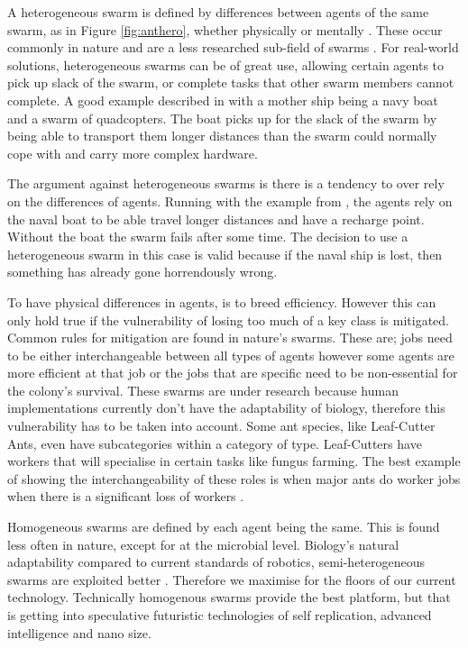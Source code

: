 \documentclass{UoYCSproject}
\begin{document}
A heterogeneous swarm is defined by differences between agents of the same swarm, as in Figure \ref{fig:anthero}, whether physically or mentally \cite{Swarm robotics reviewed, Swarm intellegiegence}.
These occur commonly in nature and are a less researched sub-field of swarms \cite{Swarm intellegiegence}.
For real-world solutions, heterogeneous swarms can be of great use, allowing certain agents to pick up slack of the swarm, or complete tasks that other swarm members cannot complete.
A good example described in \cite{Swarm robotics reviewed} with a mother ship being a navy boat and a swarm of quadcopters.
The boat picks up for the slack of the swarm by being able to transport them longer distances than the swarm could normally cope with and carry more complex hardware.

The argument against heterogeneous swarms is there is a tendency to over rely on the differences of agents.
Running with the example from \cite{Swarm robotics reviewed}, the agents rely on the naval boat to be able travel longer distances and have a recharge point.
Without the boat the swarm fails after some time.
The decision to use a heterogeneous swarm in this case is valid because if the naval ship is lost, then something has already gone horrendously wrong.

To have physical differences in agents, is to breed efficiency.
However this can only hold true if the vulnerability of losing too much of a key class is mitigated.
Common rules for mitigation are found in nature's swarms.
These are; jobs need to be either interchangeable between all types of agents however some agents are more efficient at that job \cite{Ant communication} or the jobs that are specific need to be non-essential for the colony's survival.
These swarms are under research because human implementations currently don’t have the adaptability of biology, therefore this vulnerability has to be taken into account.
Some ant species, like Leaf-Cutter Ants, even have subcategories within a category of type.
Leaf-Cutters have workers that will specialise in certain tasks like fungus farming.
The best example of showing the interchangeability of these roles is when major ants do worker jobs when there is a significant loss of workers \cite{Swarm intellegiegence}.

Homogeneous swarms are defined by each agent being the same.
This is found less often in nature, except for at the microbial level.
Biology's natural adaptability compared to current standards of robotics, semi-heterogeneous swarms are exploited better \cite{Swarm robotics reviewed, Swarm intellegiegence}.
Therefore we maximise for the floors of our current technology. 
Technically homogenous swarms provide the best platform, but that is getting into speculative futuristic technologies of self replication, advanced intelligence and nano size.
\end{document}
